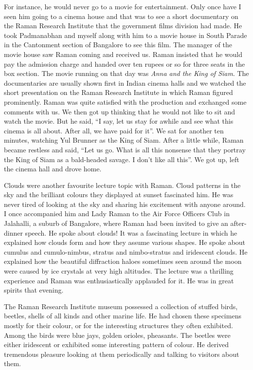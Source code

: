 For instance, he would never go to a movie for entertainment. Only once have I seen him going to a cinema house and that was to see a short documentary on the Raman Research Institute that the government films division had made. He took Padmanabhan and myself along with him to a movie house in South Parade in the Cantonment section of Bangalore to see this film. The manager of the movie house saw Raman coming and received us. Raman insisted that he would pay the admission charge and handed over ten rupees or so for three seats in the box section. The movie running on that day was {\em Anna and the King of Siam}. The documentaries are usually shown first in Indian cinema halls and we watched the short presentation on the Raman Research Institute in which Raman figured prominently. Raman was quite satisfied with the production and exchanged some comments with us. We then got up thinking that he would not like to sit and watch the movie. But he said, ``I say, let us stay for awhile and see what this cinema is all about. After all, we have paid for it''. We sat for another ten minutes, watching Yul Brunner as the King of Siam. After a little while, Raman became restless and said, ``Let us go. What is all this nonsense that they portray the King of Siam as a bald-headed savage. I don't like all this''. We got up, left the cinema hall and drove home. 

Clouds were another favourite lecture topic with Raman. Cloud patterns in the sky and the brilliant colours they displayed
at sunset fascinated him. He was never tired of looking at the sky and sharing his excitement with anyone around. I once accompanied him and Lady Raman to the Air Force Officers Club in Jalahalli, a suburb of Bangalore, where Raman had been invited
to give an after-dinner speech. He spoke about clouds! It was a fascinating lecture in which he explained how clouds form and how they assume various shapes. He spoke about cumulus and cumulo-nimbus, stratus and nimbo-stratus and iridescent clouds. He explained how the beautiful diffraction haloes sometimes seen around the moon were caused by ice crystals at very high altitudes. The lecture was a thrilling experience and Raman was enthusiastically applauded for it. He was in great spirits that evening.

The Raman Research Institute museum possessed a collection of stuffed birds, beetles, shells of all kinds and other marine life. He had chosen these specimens mostly for their colour, or for the interesting structures they often exhibited. Among the birds were blue jays, golden orioles, pheasants. The beetles were either iridescent or exhibited some interesting pattern of colour. He derived tremendous pleasure looking at them periodically and talking to visitors about them.


